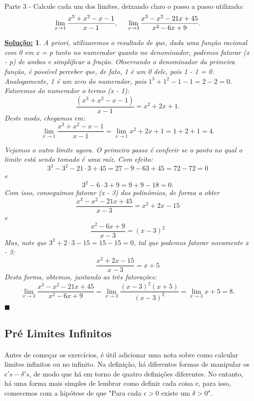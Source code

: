 \documentclass{article}
\newtheorem*{sol*}{\underline{Solu\c c\~ao:}}
\renewcommand\qedsymbol{$\blacksquare$}
\begin{document}
\paragraph{} Parte 3 - Calcule cada um dos limites, deixando claro o passo a passo utilizado:
$$
	\lim_{x\to1} \frac{x^3 + x^2 - x - 1}{x - 1}, \hspace{0.5cm} \lim_{x\to3}\frac{x^3 - x^2 - 21x + 45}{x^2 - 6x + 9}.
$$
\begin{sol*}
	A priori, utilizaremos o resultado de que, dada uma fun\c c\~ao racional com 0 em x = p tanto no numerador quanto no denominador, podemos fatorar (x - p) de ambos e simplificar a fra\c c\~ao. Observando o denominador da primeira fun\c c\~ao, \'e poss\'ivel perceber que, de fato, 1 \'e um 0 dele, pois 1 - 1 = 0. Analogamente, 1 \'e um zero do numerador, pois $1^3 + 1^2 - 1 - 1 = 2 - 2 = 0$. Fatoremos do numerador o termo (x - 1):
	$$
		\frac{(x^3 + x^2 - x - 1)}{x - 1} = x^2 + 2x + 1.
	$$
	Deste modo, chegamos em:
	$$
		\lim_{x\to{1}}\frac{x^3 + x^2 - x - 1}{x - 1} = \lim_{x\to{1}}x^2 + 2x + 1 = 1 + 2 + 1 = 4.
	$$

	Vejamos o outro limite agora. O primeiro passo \'e conferir se o ponto no qual o limite est\'a sendo tomado \'e uma ra\'iz. Com efeito:
	$$
		3^3 - 3^2 - 21\cdot{3} + 45 = 27 - 9 - 63 + 45 = 72 - 72 = 0
	$$
	e
	$$
		3^2 - 6\cdot{3} + 9 = 9 + 9 - 18 = 0.
	$$
	Com isso, conseguimos fatorar (x - 3) dos polin\^omios, de forma a obter
	$$
		\frac{x^3 - x^2 - 21x + 45}{x-3} = x^2 + 2x - 15
	$$
	e
	$$
		\frac{x^2 - 6x + 9}{x - 3}  = (x - 3)^2
	$$
	Mas, note que $3^2 + 2\cdot{3} - 15 = 15 - 15 = 0$, tal que podemos fatorar novamente x - 3:
	$$
		\frac{x^2 + 2x - 15}{x - 3} = x + 5
	$$
	Desta forma, obtemos, juntando as tr\^es fatora\c c\~oes:
	$$
		\lim_{x\to3}\frac{x^3 - x^2 - 21x + 45}{x^2 - 6x + 9} = \lim_{x\to3}\frac{(x - 3)^2 (x+5)}{(x - 3)^2} = \lim_{x\to3}x + 5 = 8.
	$$
	\qedsymbol
\end{sol*}

\subsection{Pr\'e Limites Infinitos}
\paragraph{} Antes de come\c car os exerc\'icios, \'e \'util adicionar uma nota sobre como calcular limites infinitos ou no infinito. Na defini\c c\~ao, h\'a diferentes formas de manipular os $\epsilon's-\delta's$, de modo que h\'a em torno de quatro defini\c c\~oes diferentes. No entanto, h\'a uma forma mais simples de lembrar como definir cada coisa e, para isso, comecemos com a hip\'otese de que "Para cada $\epsilon > 0$ existe um $\delta > 0$".
\end{document}
